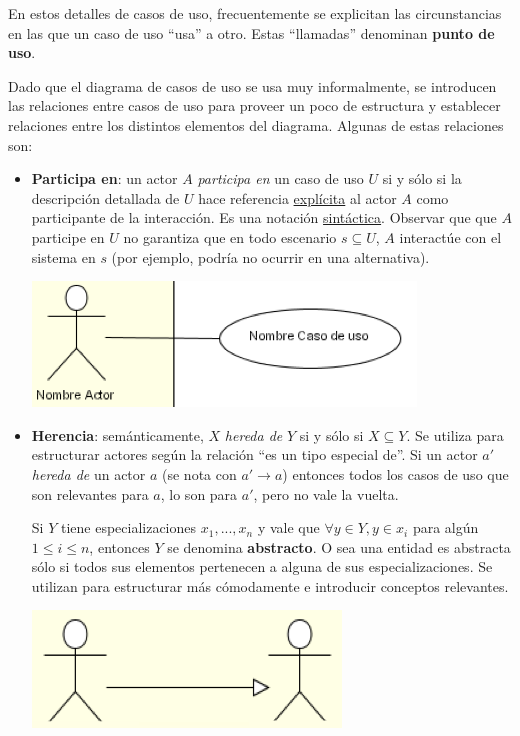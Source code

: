\documentclass[]{article}
\begin{document}
En estos detalles de casos de uso, frecuentemente se explicitan las circunstancias en las que un caso de uso ``usa'' a otro. Estas ``llamadas'' denominan \textbf{punto de uso}.

Dado que el diagrama de casos de uso se usa muy informalmente, se introducen las relaciones entre casos de uso para proveer un poco de estructura y establecer relaciones entre los distintos elementos del diagrama. Algunas de estas relaciones son:

\begin{itemize}
	\item \textbf{Participa en}: un actor $A$ \textit{participa en} un caso de uso $U$ si y sólo si la descripción detallada de $U$ hace referencia \underline{explícita} al actor $A$ como participante de la interacción. Es una notación \underline{sintáctica}. Observar que que $A$ participe en $U$ no garantiza que en todo escenario $s \subseteq U$, $A$ interactúe con el sistema en $s$ (por ejemplo, podría no ocurrir en una alternativa).

	\begin{center}
		\includegraphics[scale=0.5]{Partic.png}
	\end{center}

	\item \textbf{Herencia}: semánticamente, $X$ \textit{hereda de} $Y$ si y sólo si $X \subseteq Y$. Se utiliza para estructurar actores según la relación ``es un tipo especial de''. Si un actor $a'$ \textit{hereda de} un actor $a$ (se nota con $a' \rightarrow a$) entonces todos los casos de uso que son relevantes para $a$, lo son para $a'$, pero no vale la vuelta.

	Si $Y$ tiene especializaciones $x_1,...,x_n$ y vale que $\forall y\in Y, y\in x_i$ para algún $1\leq i\leq n$, entonces $Y$ se denomina \textbf{abstracto}. O sea una entidad es abstracta sólo si todos sus elementos pertenecen a alguna de sus especializaciones. Se utilizan para estructurar más cómodamente e introducir conceptos relevantes.

	\begin{center}
		\includegraphics[scale=0.5]{Heren.png}
	\end{center}


\end{itemize}
\end{document}
